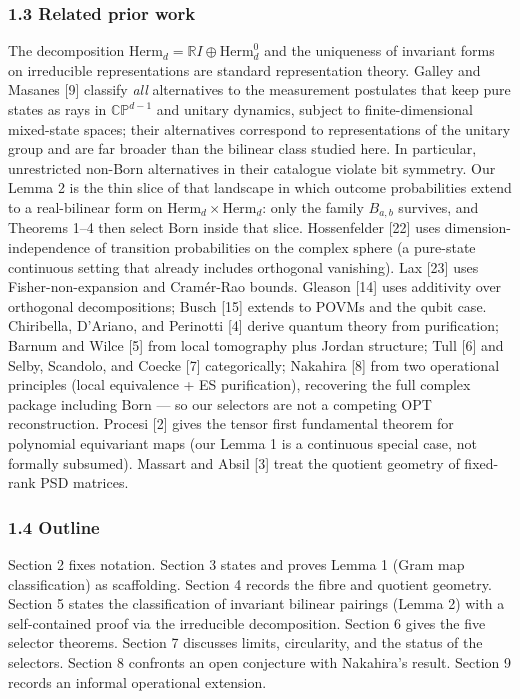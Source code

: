 \documentclass[
]{article}
\begin{document}
\subsubsection{1.3 Related prior work}\label{related-prior-work}

The decomposition \(\mathrm{Herm}_d=\mathbb RI\oplus\mathrm{Herm}_d^0\)
and the uniqueness of invariant forms on irreducible representations are
standard representation theory. Galley and Masanes {[}9{]} classify
\emph{all} alternatives to the measurement postulates that keep pure
states as rays in \(\mathbb{CP}^{d-1}\) and unitary dynamics, subject to
finite-dimensional mixed-state spaces; their alternatives correspond to
representations of the unitary group and are far broader than the
bilinear class studied here. In particular, unrestricted non-Born
alternatives in their catalogue violate bit symmetry. Our Lemma 2 is the
thin slice of that landscape in which outcome probabilities extend to a
real-bilinear form on \(\mathrm{Herm}_d\times\mathrm{Herm}_d\): only the
family \(B_{a,b}\) survives, and Theorems 1--4 then select Born inside
that slice. Hossenfelder {[}22{]} uses dimension-independence of
transition probabilities on the complex sphere (a pure-state continuous
setting that already includes orthogonal vanishing). Lax {[}23{]} uses
Fisher-non-expansion and Cramér-Rao bounds. Gleason {[}14{]} uses
additivity over orthogonal decompositions; Busch {[}15{]} extends to
POVMs and the qubit case. Chiribella, D'Ariano, and Perinotti {[}4{]}
derive quantum theory from purification; Barnum and Wilce {[}5{]} from
local tomography plus Jordan structure; Tull {[}6{]} and Selby,
Scandolo, and Coecke {[}7{]} categorically; Nakahira {[}8{]} from two
operational principles (local equivalence + ES purification), recovering
the full complex package including Born --- so our selectors are not a
competing OPT reconstruction. Procesi {[}2{]} gives the tensor first
fundamental theorem for polynomial equivariant maps (our Lemma 1 is a
continuous special case, not formally subsumed). Massart and Absil
{[}3{]} treat the quotient geometry of fixed-rank PSD matrices.

\subsubsection{1.4 Outline}\label{outline}

Section 2 fixes notation. Section 3 states and proves Lemma 1 (Gram map
classification) as scaffolding. Section 4 records the fibre and quotient
geometry. Section 5 states the classification of invariant bilinear
pairings (Lemma 2) with a self-contained proof via the irreducible
decomposition. Section 6 gives the five selector theorems. Section 7
discusses limits, circularity, and the status of the selectors. Section
8 confronts an open conjecture with Nakahira's result. Section 9 records
an informal operational extension.
\end{document}
